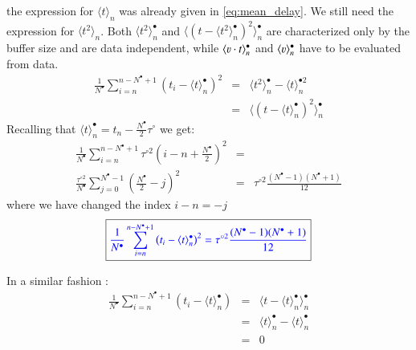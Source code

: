 the expression for $\langle t\rangle_n $ was already given in \ref{eq:mean_delay}. We still  need the expression for $\langle t^2\rangle_n$. Both $\langle t^2\rangle^\bullet_n$ and $\langle (t - \langle t^2\rangle^\bullet_n)^2\rangle^\bullet_n$ are characterized only by the buffer size and are data independent, while $\langle \varv \cdot t\rangle^\bullet_n$ and $\langle \varv \rangle^\bullet_n$ have to be evaluated from data.
\begin{eqnarray}
\frac {1}{N^\bullet}\sum\limits_{i=n}^{n-N^\bullet+1} (t_i - \langle t\rangle^\bullet_n)^2 &=&
\langle t^2\rangle^\bullet_n- \langle t\rangle^{\bullet 2}_n \nonumber\\
&=& \langle( t - \langle t\rangle^\bullet_n)^2\rangle^\bullet_n
\end{eqnarray}
Recalling that $ \langle t\rangle^\bullet_n = t_n-\frac{N^\bullet}{2}\tau^\circ$ we get:
\begin{eqnarray}
\frac {1}{N^\bullet}\sum\limits_{i=n}^{n-N^\bullet+1} \tau^{\circ 2} \left (i - n + \frac{N^\bullet}{2}\right )^2 &=&\nonumber\\
\frac { \tau^{\circ 2} }{N^\bullet}\sum\limits_{j=0}^{N^\bullet-1}(\frac{N^\bullet}{2}-j)^2 &=& \tau^{\circ 2} \frac{(N^\bullet-1)(N^\bullet+1)}{12}
\end{eqnarray}
where we have changed the index $i-n=-j$
\begin{equation}
\boxed{\color{blue}
\frac {1}{N^\bullet}\sum\limits_{i=n}^{n-N^\bullet+1} \left (t_i - \langle t\rangle^\bullet _n\right)^2=\tau^{\circ 2} \frac{(N^\bullet-1)(N^\bullet+1)}{12}
}
\end{equation}


In a similar fashion :
\begin{eqnarray}
\frac {1}{N^\bullet}\sum\limits_{i=n}^{n-N^\bullet+1} (t_i - \langle t\rangle^\bullet_n) &=&
\langle t - \langle t\rangle^\bullet_n\rangle^\bullet_n \nonumber\\
&=& \langle t \rangle^\bullet_n - \langle t\rangle^\bullet_n \nonumber\\ &=& 0
\end{eqnarray}

